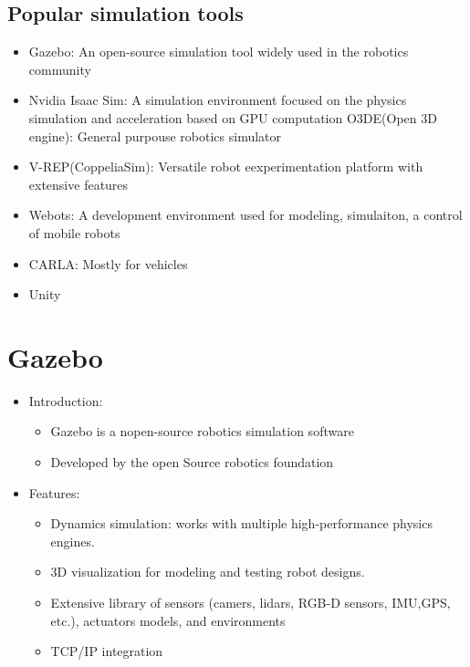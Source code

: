 \subsection{Popular simulation tools}
\begin{itemize}
        \item Gazebo: An open-source simulation tool widely used in the robotics community
        \item Nvidia Isaac Sim: A simulation environment focused on the physics simulation and acceleration based on GPU computation
            \oitem O3DE(Open 3D engine): General purpouse robotics simulator
        \item V-REP(CoppeliaSim): Versatile robot eexperimentation platform with extensive features
        \item Webots: A development environment used for modeling, simulaiton, a control of mobile robots
        \item CARLA: Mostly for vehicles
        \item Unity
        
\end{itemize}

\section{Gazebo}
\begin{itemize}
        \item Introduction:
            \begin{itemize}
                    \item Gazebo is a nopen-source robotics simulation software
                    \item Developed by the open Source robotics foundation
                    
            \end{itemize}
        \item Features:
            \begin{itemize}
                    \item Dynamics simulation: works with multiple high-performance physics engines.
                    \item 3D visualization for modeling and testing robot designs.
                    \item Extensive library of sensors (camers, lidars, RGB-D sensors, IMU,GPS, etc.), actuators models, and environments
                    \item TCP/IP integration
                    
            \end{itemize}
        
\end{itemize}

